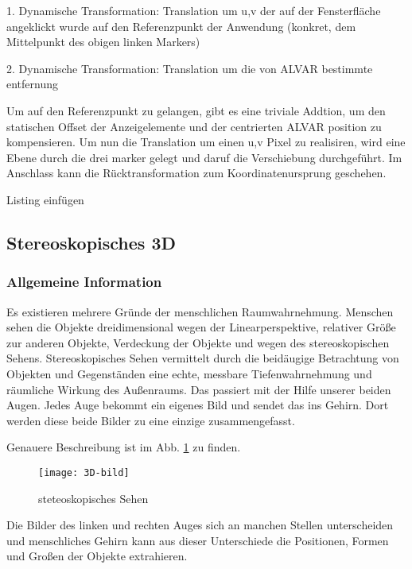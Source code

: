     1. Dynamische Transformation:  Translation  um u,v der auf der Fensterfläche angeklickt wurde auf den Referenzpunkt der Anwendung (konkret, dem Mittelpunkt des obigen linken Markers) 

    2. Dynamische Transformation: Translation um die von ALVAR bestimmte entfernung

Um auf den Referenzpunkt zu gelangen, gibt es eine triviale Addtion, um den statischen Offset der Anzeigelemente und der centrierten ALVAR position zu kompensieren. Um nun die Translation um einen u,v Pixel zu realisiren, wird eine Ebene durch die drei marker gelegt und daruf die Verschiebung durchgeführt. Im Anschlass kann die Rücktransformation zum Koordinatenursprung geschehen.

    Listing einfügen



\subsection{Stereoskopisches 3D}

\subsubsection{Allgemeine Information}
Es existieren mehrere Gründe der menschlichen Raumwahrnehmung.
Menschen sehen die Objekte dreidimensional wegen der Linearperspektive, relativer Größe zur anderen Objekte, Verdeckung der Objekte und wegen des stereoskopischen Sehens. 
Stereoskopisches Sehen vermittelt durch die beidäugige Betrachtung von Objekten und Gegenständen eine echte, messbare Tiefenwahrnehmung und räumliche Wirkung des Außenraums. 
Das passiert mit der Hilfe unserer beiden Augen.
Jedes Auge bekommt ein eigenes Bild und sendet das ins Gehirn. 
Dort werden diese beide Bilder zu eine einzige zusammengefasst.

Genauere Beschreibung ist im Abb. \ref{fig:3D} zu finden.

\begin{figure}[h]
   \centering
   \texttt{[image: 3D-bild]}
   \caption{steteoskopisches Sehen}
   \label{fig:3D}
\end{figure}

Die Bilder des linken und rechten Auges sich an manchen Stellen unterscheiden und menschliches Gehirn kann aus dieser Unterschiede die Positionen, Formen und Großen der Objekte extrahieren.

